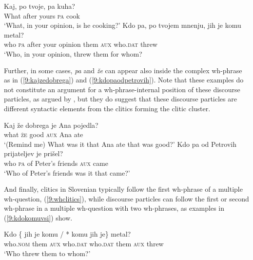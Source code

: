 \documentclass[output=paper,modfonts,newtxmath,hidelinks]{langscibook}
\begin{document}
\begin{exe}
\ex \label{9:kdopotvojepak} \gll 
 Kaj, po tvoje, pa kuha?\\
	What after yours	 \textsc{pa} cook\\
	\trans `What, in your opinion, is he cooking?'
\ex \label{9:kdopapotvoje}
 \gll Kdo pa, po tvojem mnenju, jih je komu metal?\\
	who \textsc{pa} after your opinion them \textsc{aux} who.\textsc{dat} threw\\
	\trans  `Who, in your opinion, threw them for whom?
\end{exe}

\noindent Further, in some cases, \textit{pa} and \textit{že} can appear also inside the complex wh-phrase as in (\ref{9:kajzedobrega}) and (\ref{9:kdopaodpetrovih}). Note that these examples do not constitute an argument for a wh-phrase-internal position of these discourse particles, as argued by \cite{marusicetal2015}, but they do suggest that these discourse particles are different syntactic elements from the clitics forming the clitic cluster.

\begin{exe}
\ex \label{9:kajzedobrega}
\gll Kaj že dobrega je Ana 	pojedla? \\
 	what \textsc{že} good \textsc{aux} Ana	ate\\
\trans  `(Remind me) What was it that Ana ate that was good?'
\ex \label{9:kdopaodpetrovih}
\gll Kdo pa od Petrovih prijateljev je prišel?\\
 	who \textsc{pa} of Peter's friends \textsc{aux} came\\
\glt  `Who of Peter's friends was it that came?'\\
\hfill\citep[(38)]{marusicetal2015}
\end{exe}

\noindent And finally, clitics in Slovenian typically follow the first wh-phrase of a multiple wh-question, (\ref{9:whclitics}), while discourse particles can follow the first or second wh-phrase in a multiple wh-question with two wh-phrases, as examples in (\ref{9:kdokomuvsi}) show.  

\begin{exe}
\ex  \label{9:whclitics}
 \gll Kdo \{\hspace{-2pt} jih je komu / *\hspace{-2pt} komu jih je\} metal?\\
   who.\textsc{nom} {} them \textsc{aux} who.\textsc{dat} {} {} who.\textsc{dat} them \textsc{aux} threw \\
   \glt `Who threw them to whom?'
\end{exe}
\end{document}
